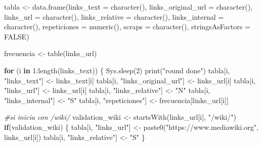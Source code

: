 \documentclass[
]{article}
\newenvironment{Shaded}{\begin{snugshade}}{\end{snugshade}}
\newcommand{\AttributeTok}[1]{\textcolor[rgb]{0.77,0.63,0.00}{#1}}
\newcommand{\CommentTok}[1]{\textcolor[rgb]{0.56,0.35,0.01}{\textit{#1}}}
\newcommand{\ConstantTok}[1]{\textcolor[rgb]{0.00,0.00,0.00}{#1}}
\newcommand{\ControlFlowTok}[1]{\textcolor[rgb]{0.13,0.29,0.53}{\textbf{#1}}}
\newcommand{\DecValTok}[1]{\textcolor[rgb]{0.00,0.00,0.81}{#1}}
\newcommand{\FunctionTok}[1]{\textcolor[rgb]{0.00,0.00,0.00}{#1}}
\newcommand{\NormalTok}[1]{#1}
\newcommand{\OtherTok}[1]{\textcolor[rgb]{0.56,0.35,0.01}{#1}}
\newcommand{\SpecialCharTok}[1]{\textcolor[rgb]{0.00,0.00,0.00}{#1}}
\newcommand{\StringTok}[1]{\textcolor[rgb]{0.31,0.60,0.02}{#1}}
\begin{document}
\begin{Shaded}
\begin{Highlighting}[]
\NormalTok{tabla }\OtherTok{\textless{}{-}} \FunctionTok{data.frame}\NormalTok{(}\AttributeTok{links\_text =} \FunctionTok{character}\NormalTok{(),}
                    \AttributeTok{links\_original\_url =} \FunctionTok{character}\NormalTok{(),}
                    \AttributeTok{links\_url =} \FunctionTok{character}\NormalTok{(),}
                    \AttributeTok{links\_relative =} \FunctionTok{character}\NormalTok{(),}
                    \AttributeTok{links\_internal =} \FunctionTok{character}\NormalTok{(),}
                    \AttributeTok{repeticiones =} \FunctionTok{numeric}\NormalTok{(),}
                    \AttributeTok{scraps =} \FunctionTok{character}\NormalTok{(),}
                    \AttributeTok{stringsAsFactors =} \ConstantTok{FALSE}\NormalTok{)}

\NormalTok{frecuencia }\OtherTok{\textless{}{-}} \FunctionTok{table}\NormalTok{(links\_url)}

\ControlFlowTok{for}\NormalTok{ (i }\ControlFlowTok{in} \DecValTok{1}\SpecialCharTok{:}\FunctionTok{length}\NormalTok{(links\_text)) \{}
  \FunctionTok{Sys.sleep}\NormalTok{(}\DecValTok{2}\NormalTok{)}
  \FunctionTok{print}\NormalTok{(}\StringTok{"round done"}\NormalTok{)}
\NormalTok{  tabla[i, }\StringTok{"links\_text"}\NormalTok{] }\OtherTok{\textless{}{-}}\NormalTok{ links\_text[i]}
\NormalTok{  tabla[i, }\StringTok{"links\_original\_url"}\NormalTok{] }\OtherTok{\textless{}{-}}\NormalTok{ links\_url[i]}
\NormalTok{  tabla[i, }\StringTok{"links\_url"}\NormalTok{] }\OtherTok{\textless{}{-}}\NormalTok{ links\_url[i]}
\NormalTok{  tabla[i, }\StringTok{"links\_relative"}\NormalTok{] }\OtherTok{\textless{}{-}} \StringTok{"N"}
\NormalTok{  tabla[i, }\StringTok{"links\_internal"}\NormalTok{] }\OtherTok{\textless{}{-}} \StringTok{"S"}
\NormalTok{  tabla[i, }\StringTok{"repeticiones"}\NormalTok{] }\OtherTok{\textless{}{-}}\NormalTok{ frecuencia[links\_url[i]]}
  
  \CommentTok{\#si inicia con /wiki/}
\NormalTok{  validation\_wiki }\OtherTok{\textless{}{-}} \FunctionTok{startsWith}\NormalTok{(links\_url[i], }\StringTok{"/wiki/"}\NormalTok{)}
  \ControlFlowTok{if}\NormalTok{(validation\_wiki) \{}
\NormalTok{    tabla[i, }\StringTok{"links\_url"}\NormalTok{] }\OtherTok{\textless{}{-}} \FunctionTok{paste0}\NormalTok{(}\StringTok{"https://www.mediawiki.org"}\NormalTok{, links\_url[i])}
\NormalTok{    tabla[i, }\StringTok{"links\_relative"}\NormalTok{] }\OtherTok{\textless{}{-}} \StringTok{"S"}
\NormalTok{  \}}
  

\end{Highlighting}
\end{Shaded}
\end{document}
